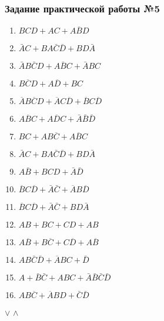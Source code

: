 \subsubsection{Задание практической работы №5}
\begin{enumerate}
\item $BCD+AC+A\overline{B}D$
\item $\bar{A}C+BA\bar{C}\bar{D}+BD\bar{A}$
\item $\bar{A}B\bar{C}D+A\bar{B}C+\bar{A}BC$
\item $B\overline{C}D+A\overline{D}+BC$
\item $\overline{A}B\overline{C}D+\overline{A}C\overline{D}+\overline{B}C\overline{D}$
\item $A\overline{B}C+A\overline{D}C+\bar{A}\bar{B}\bar{D}$
\item $BC+AB\overline{C}+A\overline{B}C$
\item $\bar{A}C+BA\bar{C}\bar{D}+BD\bar{A}$
\item $A\bar{B} + BCD + \bar{A}\bar{D}$

\item $\overline{B}C\overline{D} + \bar{A}\bar{C} + \overline{A}B\overline{D}$
\item $\overline{B}C\overline{D} + \bar{A}\bar{C} + BD\bar{A}$
\item $AB + BC + CD + AB$
\item $A\overline{B} + B\overline{C} + C\overline{D} + A\overline{B}$

\item $AB\bar{C}\bar{D} + \overline{A}BC + \bar{D}$
\item $A + \bar{B}\bar{C} + ABC + \bar{A}\bar{B}\bar{C}\bar{D}$
\item $AB\overline{C} + \overline{A}BD + \bar{C}\bar{D}$
\end{enumerate}
$\vee$ $\wedge$

